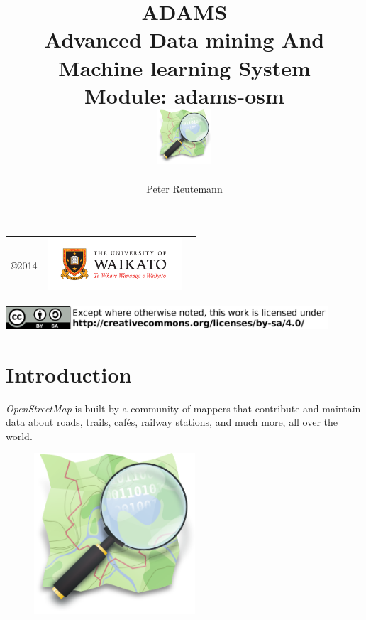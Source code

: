 \documentclass[a4paper]{book}
\title{
  \textbf{ADAMS} \\
  {\Large \textbf{A}dvanced \textbf{D}ata mining \textbf{A}nd \textbf{M}achine
  learning \textbf{S}ystem} \\
  {\Large Module: adams-osm} \\
  \vspace{1cm}
  \includegraphics[width=2cm]{images/osm-module.png} \\
}
\author{
  Peter Reutemann
}
\begin{document}
\begin{titlepage}
\maketitle

\thispagestyle{empty}
\center
\begin{table}[b]
	\begin{tabular}{c l l}
		\parbox[c][2cm]{2cm}{\copyright 2014} &
		\parbox[c][2cm]{5cm}{\includegraphics[width=5cm]{images/coat_of_arms.pdf}} \\
	\end{tabular}
	\includegraphics[width=12cm]{images/cc.png} \\
\end{table}

\end{titlepage}

\tableofcontents
\listoffigures

\chapter{Introduction}
\textit{OpenStreetMap}\cite{osm} is built by a community of mappers that contribute and
maintain data about roads, trails, cafés, railway stations, and much more, all
over the world.

\begin{figure}[htb]
  \centering
  \includegraphics[width=6.0cm]{images/osm_logo.png}
  \label{osm_logo}
\end{figure}
\end{document}
